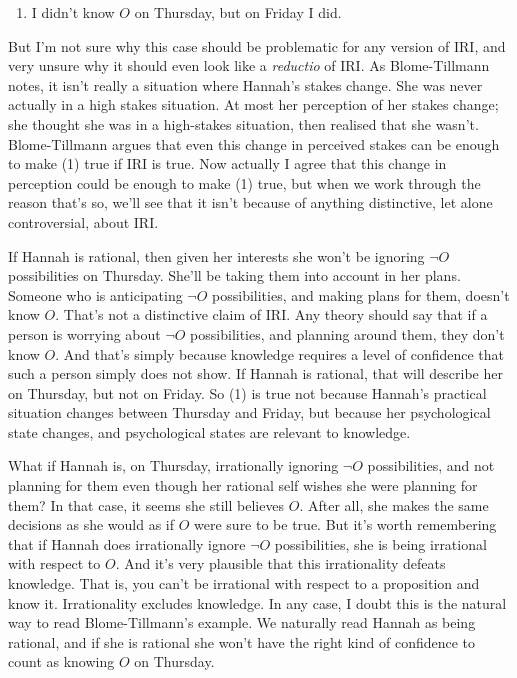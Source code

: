 \documentclass[
  11pt,
  letterpaper,
  DIV=11,
  numbers=noendperiod,
  oneside]{scrartcl}
\providecommand{\tightlist}{%
  \setlength{\itemsep}{0pt}\setlength{\parskip}{0pt}}\usepackage{longtable,booktabs,array}
\begin{document}
\begin{enumerate}
\def\labelenumi{(\arabic{enumi})}
\tightlist
\item
  I didn't know \(O\) on Thursday, but on Friday I did.
\end{enumerate}

But I'm not sure why this case should be problematic for any version of
IRI, and very unsure why it should even look like a \emph{reductio} of
IRI. As Blome-Tillmann notes, it isn't really a situation where Hannah's
stakes change. She was never actually in a high stakes situation. At
most her perception of her stakes change; she thought she was in a
high-stakes situation, then realised that she wasn't. Blome-Tillmann
argues that even this change in perceived stakes can be enough to make
(1) true if IRI is true. Now actually I agree that this change in
perception could be enough to make (1) true, but when we work through
the reason that's so, we'll see that it isn't because of anything
distinctive, let alone controversial, about IRI.

If Hannah is rational, then given her interests she won't be ignoring
\(\neg O\) possibilities on Thursday. She'll be taking them into account
in her plans. Someone who is anticipating \(\neg O\) possibilities, and
making plans for them, doesn't know \(O\). That's not a distinctive
claim of IRI. Any theory should say that if a person is worrying about
\(\neg O\) possibilities, and planning around them, they don't know
\(O\). And that's simply because knowledge requires a level of
confidence that such a person simply does not show. If Hannah is
rational, that will describe her on Thursday, but not on Friday. So (1)
is true not because Hannah's practical situation changes between
Thursday and Friday, but because her psychological state changes, and
psychological states are relevant to knowledge.

What if Hannah is, on Thursday, irrationally ignoring \(\neg O\)
possibilities, and not planning for them even though her rational self
wishes she were planning for them? In that case, it seems she still
believes \(O\). After all, she makes the same decisions as she would as
if \(O\) were sure to be true. But it's worth remembering that if Hannah
does irrationally ignore \(\neg O\) possibilities, she is being
irrational with respect to \(O\). And it's very plausible that this
irrationality defeats knowledge. That is, you can't be irrational with
respect to a proposition and know it. Irrationality excludes knowledge.
In any case, I doubt this is the natural way to read Blome-Tillmann's
example. We naturally read Hannah as being rational, and if she is
rational she won't have the right kind of confidence to count as knowing
\(O\) on Thursday.
\end{document}

